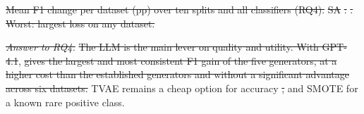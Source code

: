 \documentclass[conference]{IEEEtran}
\newcommand{\system}{\textsc{Synthagent}\xspace}
\newcommand{\best}[1]{\textbf{#1}}
\providecommand{\DIFaddtex}[1]{{\protect\color{blue}\uwave{#1}}} %
\providecommand{\DIFdeltex}[1]{{\protect\color{red}\sout{#1}}}                      %
\providecommand{\DIFaddbegin}{} %
\providecommand{\DIFaddend}{} %
\providecommand{\DIFdelbegin}{} %
\providecommand{\DIFdelend}{} %
\providecommand{\DIFdelFL}[1]{\DIFdel{#1}} %
\providecommand{\DIFadd}[1]{\texorpdfstring{\DIFaddtex{#1}}{#1}} %
\providecommand{\DIFdel}[1]{\texorpdfstring{\DIFdeltex{#1}}{}} %
\newcommand{\DIFscaledelfig}{0.5}
\newlength{\DIFdelgraphicswidth} %
\newlength{\DIFdelgraphicsheight} %
\newcommand{\DIFaddincludegraphics}[2][]{{\color{blue}\fbox{\DIFOincludegraphics[#1]{#2}}}} %
\newcommand{\DIFdelincludegraphics}[2][]{%
\sbox{\DIFdelgraphicsbox}{\DIFOincludegraphics[#1]{#2}}%
\settoboxwidth{\DIFdelgraphicswidth}{\DIFdelgraphicsbox} %
\settoboxtotalheight{\DIFdelgraphicsheight}{\DIFdelgraphicsbox} %
\scalebox{\DIFscaledelfig}{%
\parbox[b]{\DIFdelgraphicswidth}{\usebox{\DIFdelgraphicsbox}\\[-\baselineskip] \rule{\DIFdelgraphicswidth}{0em}}\llap{\resizebox{\DIFdelgraphicswidth}{\DIFdelgraphicsheight}{%
\setlength{\unitlength}{\DIFdelgraphicswidth}%
\begin{picture}(1,1)%
\thicklines\linethickness{2pt} %
{\color[rgb]{1,0,0}\put(0,0){\framebox(1,1){}}}%
{\color[rgb]{1,0,0}\put(0,0){\line( 1,1){1}}}%
{\color[rgb]{1,0,0}\put(0,1){\line(1,-1){1}}}%
\end{picture}%
}\hspace*{3pt}}} %
} %
\DeclareRobustCommand{\DIFaddbegin}{\DIFOaddbegin \let\includegraphics\DIFaddincludegraphics} %
\DeclareRobustCommand{\DIFaddend}{\DIFOaddend \let\includegraphics\DIFOincludegraphics} %
\DeclareRobustCommand{\DIFdelbegin}{\DIFOdelbegin \let\includegraphics\DIFdelincludegraphics} %
\DeclareRobustCommand{\DIFdelend}{\DIFOaddend \let\includegraphics\DIFOincludegraphics} %
\begin{document}
{%
\DIFdelFL{Mean F1 change per dataset (pp) over ten splits and all classifiers (RQ4). }\textsc{\DIFdelFL{SA}}%
\DIFdelFL{: }%
\DIFdelFL{. Worst: largest loss on any dataset.}}

\textit{\DIFdel{Answer to RQ4.}} %
\DIFdel{The LLM is the main lever on quality and utility. With GPT-4.1}\DIFdelend \DIFaddbegin \DIFadd{)}\DIFaddend , \DIFdelbegin %
\DIFdel{gives the largest and most consistent F1 gain of the five generators, at a higher cost than the established generators and without a significant advantage across six datasets. }\DIFdelend \DIFaddbegin \DIFadd{so }\DIFaddend TVAE remains a cheap option for accuracy \DIFdelbegin \DIFdel{, }\DIFdelend and SMOTE for a known rare positive class.
\end{document}
